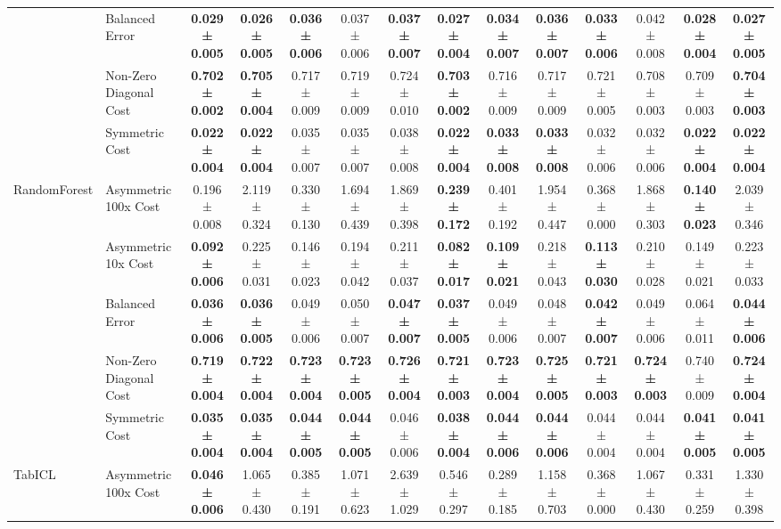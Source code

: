 \begin{table}[H]
{\begin{tabular}{llcccccccccccc}
 & Balanced Error & \textbf{0.029 ± 0.005} & \textbf{0.026 ± 0.005} & \textbf{0.036 ± 0.006} & 0.037 ± 0.006 & \textbf{0.037 ± 0.007} & \textbf{0.027 ± 0.004} & \textbf{0.034 ± 0.007} & \textbf{0.036 ± 0.007} & \textbf{0.033 ± 0.006} & 0.042 ± 0.008 & \textbf{0.028 ± 0.004} & \textbf{0.027 ± 0.005} \\
 & Non-Zero Diagonal Cost & \textbf{0.702 ± 0.002} & \textbf{0.705 ± 0.004} & 0.717 ± 0.009 & 0.719 ± 0.009 & 0.724 ± 0.010 & \textbf{0.703 ± 0.002} & 0.716 ± 0.009 & 0.717 ± 0.009 & 0.721 ± 0.005 & 0.708 ± 0.003 & 0.709 ± 0.003 & \textbf{0.704 ± 0.003} \\
 & Symmetric Cost & \textbf{0.022 ± 0.004} & \textbf{0.022 ± 0.004} & 0.035 ± 0.007 & 0.035 ± 0.007 & 0.038 ± 0.008 & \textbf{0.022 ± 0.004} & \textbf{0.033 ± 0.008} & \textbf{0.033 ± 0.008} & 0.032 ± 0.006 & 0.032 ± 0.006 & \textbf{0.022 ± 0.004} & \textbf{0.022 ± 0.004} \\
\cline{1-14}
\multirow[t]{5}{*}{RandomForest} & Asymmetric 100x Cost & 0.196 ± 0.008 & 2.119 ± 0.324 & 0.330 ± 0.130 & 1.694 ± 0.439 & 1.869 ± 0.398 & \textbf{0.239 ± 0.172} & 0.401 ± 0.192 & 1.954 ± 0.447 & 0.368 ± 0.000 & 1.868 ± 0.303 & \textbf{0.140 ± 0.023} & 2.039 ± 0.346 \\
 & Asymmetric 10x Cost & \textbf{0.092 ± 0.006} & 0.225 ± 0.031 & 0.146 ± 0.023 & 0.194 ± 0.042 & 0.211 ± 0.037 & \textbf{0.082 ± 0.017} & \textbf{0.109 ± 0.021} & 0.218 ± 0.043 & \textbf{0.113 ± 0.030} & 0.210 ± 0.028 & 0.149 ± 0.021 & 0.223 ± 0.033 \\
 & Balanced Error & \textbf{0.036 ± 0.006} & \textbf{0.036 ± 0.005} & 0.049 ± 0.006 & 0.050 ± 0.007 & \textbf{0.047 ± 0.007} & \textbf{0.037 ± 0.005} & 0.049 ± 0.006 & 0.048 ± 0.007 & \textbf{0.042 ± 0.007} & 0.049 ± 0.006 & 0.064 ± 0.011 & \textbf{0.044 ± 0.006} \\
 & Non-Zero Diagonal Cost & \textbf{0.719 ± 0.004} & \textbf{0.722 ± 0.004} & \textbf{0.723 ± 0.004} & \textbf{0.723 ± 0.005} & \textbf{0.726 ± 0.004} & \textbf{0.721 ± 0.003} & \textbf{0.723 ± 0.004} & \textbf{0.725 ± 0.005} & \textbf{0.721 ± 0.003} & \textbf{0.724 ± 0.003} & 0.740 ± 0.009 & \textbf{0.724 ± 0.004} \\
 & Symmetric Cost & \textbf{0.035 ± 0.004} & \textbf{0.035 ± 0.004} & \textbf{0.044 ± 0.005} & \textbf{0.044 ± 0.005} & 0.046 ± 0.006 & \textbf{0.038 ± 0.004} & \textbf{0.044 ± 0.006} & \textbf{0.044 ± 0.006} & 0.044 ± 0.004 & 0.044 ± 0.004 & \textbf{0.041 ± 0.005} & \textbf{0.041 ± 0.005} \\
\cline{1-14}
\multirow[t]{5}{*}{TabICL} & Asymmetric 100x Cost & \textbf{0.046 ± 0.006} & 1.065 ± 0.430 & 0.385 ± 0.191 & 1.071 ± 0.623 & 2.639 ± 1.029 & 0.546 ± 0.297 & 0.289 ± 0.185 & 1.158 ± 0.703 & 0.368 ± 0.000 & 1.067 ± 0.430 & 0.331 ± 0.259 & 1.330 ± 0.398 \\

\end{tabular}}
\end{table}
